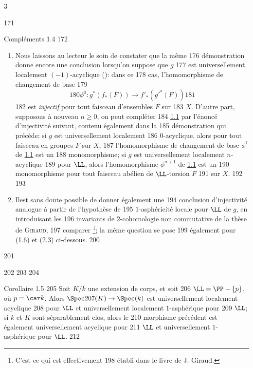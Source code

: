 3	\documentclass[10pt]{../fichiers-configuration-latex/smfart}
\begin{document}
   171	\begin{enonce*}[remark]{Compléments 1.4}
   172	\begin{enumerate}
   173	\renewcommand{\theenumi}{\alph{enumi}}
   174	\renewcommand{\labelenumi}{\theenumi)}
   175	\item Nous laissons au lecteur le soin de constater que la même
   176	  démonstration donne encore une conclusion lorsqu'on suppose que $g$
   177	  est universellement localement $(-1)$-acyclique (): dans ce
   178	  cas, l'homomorphisme de changement de base
   179	$$
   180	\phi^{0}:g^{\ast}(f_{\ast}(F))\longrightarrow f'_{\ast}({g'}^{\ast}(F))
   181	$$
   182	est \emph{injectif} pour tout faisceau d'ensembles $F$ sur
   183	$X$. D'autre part, supposons à nouveau $n\geq 0$, on peut compléter
   184	\hyperref[XVI.thm1.1]{1.1} par l'énoncé d'injectivité suivant, contenu également dans la
   185	démonstration qui précède: si $g$ est universellement localement
   186	$0$-acyclique, alors pour tout faisceau en groupes $F$ sur $X$,
   187	l'homomorphisme de changement de base $\phi^{1}$ de \hyperref[XVI.thm1.1]{1.1} est un
   188	monomorphisme; si $g$ est universellement localement $n$-acyclique
   189	pour $\LL$, alors l'homomorphisme $\phi^{n+1}$ de \hyperref[XVI.thm1.1]{1.1} est un
   190	monomorphisme pour tout faisceau abélien de $\LL$-torsion $F$
   191	sur $X$.
   192	
   193	\item Il\pageoriginale est sans doute possible de donner également une
   194	  conclusion d'injectivité analogue à partir de l'hypothèse de
   195	  $1$-asphéricité locale pour $\LL$ de $g$, en introduisant les
   196	  invariants de $2$-cohomologie non commutative de la thèse de \textsc{Giraud},
   197	  comparer  \footnote[1]{C'est ce qui est effectivement
   198	  établi dans le livre de J. Giraud.}; la même question se pose
   199	  également pour (\hyperref[XVI.cor1.6]{1.6}) et (\hyperref[XVI.cor2.3]{2.3}) ci-dessous.
   200	\end{enumerate}
   201	\end{enonce*}
   202	
   203	%
   204	\begin{enonce*}{Corollaire 1.5}
   205	Soit $K/k$ une extension de corps, et soit
   206	$\LL=\PP-\{p\}$, où $p= \car k$. Alors $\Spec
   207	(K)\rightarrow \Spec (k)$ est universellement localement acyclique
   208	pour $\LL$ et universellement localement $1$-asphérique pour
   209	$\LL$; si $k$ et $K$ sont séparablement clos, alors le
   210	morphisme précédent est également universellement acyclique pour
   211	$\LL$ et universellement $1$-asphérique pour $\LL$.
   212	\end{enonce*}
\end{document}
